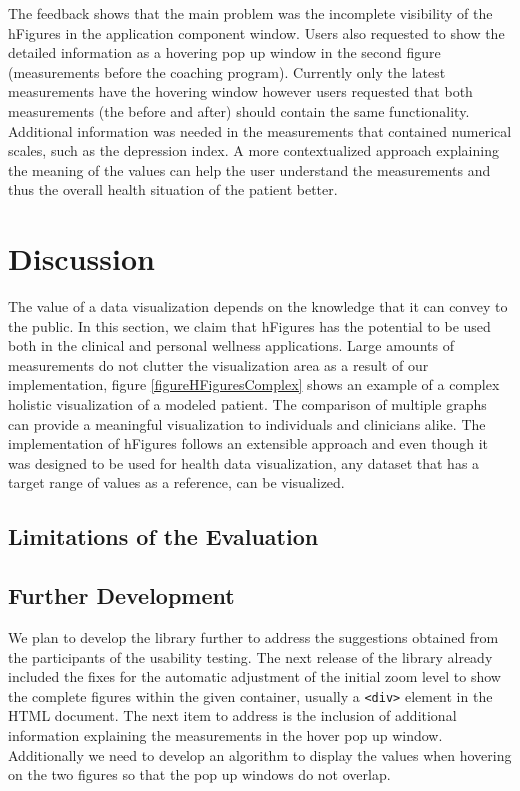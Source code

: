 \documentclass[twocolumn]{bmcart}%
\begin{document}
The feedback shows that the main problem was the incomplete visibility of the hFigures in the application component window. Users also requested to show the detailed information as a hovering pop up window in the second figure (measurements before the coaching program). Currently only the latest measurements have the hovering window however users requested that both measurements (the before and after) should contain the same functionality. Additional information was needed in the measurements that contained numerical scales, such as the depression index. A more contextualized approach explaining the meaning of the values can help the user understand the measurements and thus the overall health situation of the patient better.

\section*{Discussion}

The value of a data visualization depends on the knowledge that it can convey to the public. In this section, we claim that hFigures has the potential to be used both in the clinical and personal wellness applications. Large amounts of measurements do not clutter the visualization area as a result of our implementation, figure \ref{figureHFiguresComplex} shows an example of a complex holistic visualization of a modeled patient. The comparison of multiple graphs can provide a meaningful visualization to individuals and clinicians alike. The implementation of hFigures follows an extensible approach and even though it was designed to be used for health data visualization, any dataset that has a target range of values as a reference, can be visualized.

\subsection*{Limitations of the Evaluation}

\subsection*{Further Development}

We plan to develop the library further to address the suggestions obtained from the participants of the usability testing. The next release of the library already included the fixes for the automatic adjustment of the initial zoom level to show the complete figures within the given container, usually a \texttt{<div>} element in the HTML document. The next item to address is the inclusion of additional information explaining the measurements in the hover pop up window. Additionally we need to develop an algorithm to display the values when hovering on the two figures so that the pop up windows do not overlap.
\end{document}
